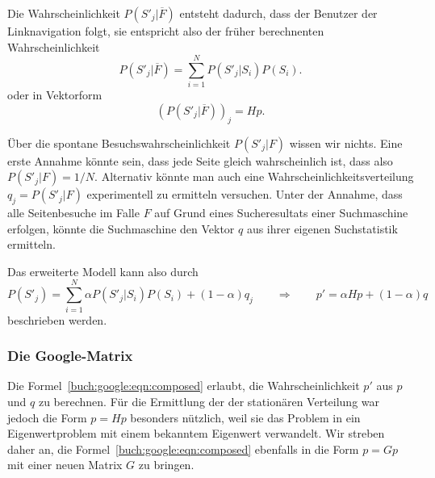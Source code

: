 Die Wahrscheinlichkeit $P(S'_j|\overline{F})$ entsteht dadurch, dass
der Benutzer der Linknavigation folgt, sie entspricht also der früher
berechnenten Wahrscheinlichkeit
\[
P(S'_j|\overline{F}) = \sum_{i=1}^N P(S'_j|S_i) P(S_i).
\]
oder in Vektorform
\[
(P(S'_j|\overline{F}))_j
=
Hp.
\]

Über die spontane Besuchswahrscheinlichkeit $P(S'_j|F)$ wissen wir 
nichts.
Eine erste Annahme könnte sein, dass jede Seite gleich wahrscheinlich
ist, dass also $P(S'_j|F)=1/N$.
Alternativ könnte man auch eine Wahrscheinlichkeitsverteilung
$q_j = P(S'_j|F)$ experimentell zu ermitteln versuchen.
Unter der Annahme, dass alle Seitenbesuche im Falle $F$ auf Grund
eines Sucheresultats einer Suchmaschine erfolgen, könnte die
Suchmaschine den Vektor $q$ aus ihrer eigenen Suchstatistik ermitteln.

Das erweiterte Modell kann also durch
\begin{equation}
P(S'_j)
=
\sum_{i=1}^N
\alpha P(S'_j|S_i) P(S_i)
+
(1-\alpha) q_j
\qquad\Rightarrow\qquad
p'
=
\alpha Hp
+
(1-\alpha)q
\label{buch:google:eqn:composed}
\end{equation}
beschrieben werden.

\subsubsection{Die Google-Matrix}
Die Formel~\eqref{buch:google:eqn:composed} erlaubt, die Wahrscheinlichkeit
$p'$ aus $p$ und $q$ zu berechnen.
Für die Ermittlung der der stationären Verteilung war jedoch die Form
$p=Hp$ besonders nützlich, weil sie das Problem in ein Eigenwertproblem
mit einem bekanntem Eigenwert verwandelt.
Wir streben daher an, die Formel~\eqref{buch:google:eqn:composed}
ebenfalls in die Form $p=Gp$ mit einer neuen Matrix $G$ zu bringen.

